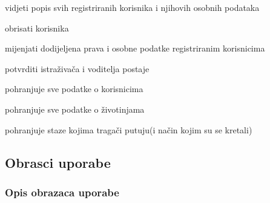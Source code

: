 \begin{packed_enum}
				\item  {}
				
				\begin{packed_enum}
					\item vidjeti popis svih registriranih korisnika i njihovih osobnih podataka
					\item obrisati korisnika
					\item mijenjati dodijeljena prava i osobne podatke registriranim korisnicima
					\item potvrditi istraživača i voditelja postaje
				\end{packed_enum}

				\item  {}
				
				\begin{packed_enum}
					\item pohranjuje sve podatke o korisnicima 
					\item pohranjuje sve podatke o životinjama
					\item pohranjuje staze kojima tragači putuju(i način kojim su se kretali)
				\end{packed_enum}


			\end{packed_enum}
			
			\eject 
			
			
				
			\subsection{Obrasci uporabe}
								
				\subsubsection{Opis obrazaca uporabe}
					

